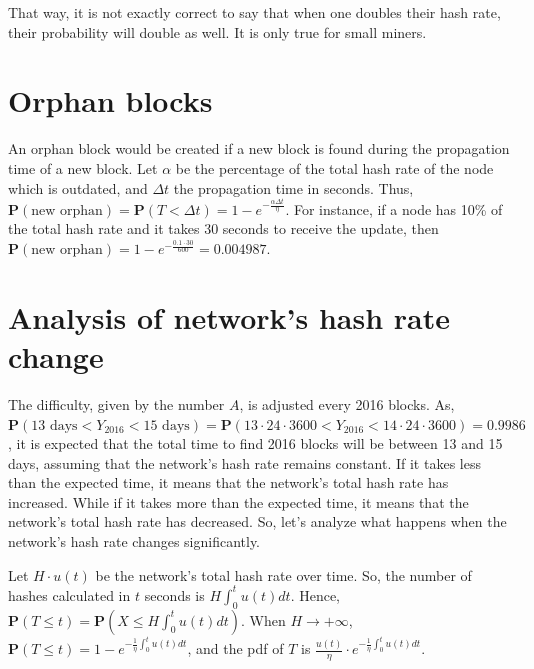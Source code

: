 That way, it is not exactly correct to say that when one doubles their hash rate, their probability will double as well. It is only true for small miners.

\section{Orphan blocks}

An orphan block would be created if a new block is found during the propagation time of a new block. Let $\alpha$ be the percentage of the total hash rate of the node which is outdated, and $\Delta t$ the propagation time in seconds. Thus, $\mathbf{P}(\text{new orphan}) = \mathbf{P}(T < \Delta t) = 1 - e^{-\frac{\alpha \Delta t}{\eta}}$. For instance, if a node has 10\% of the total hash rate and it takes 30 seconds to receive the update, then $\mathbf{P}(\text{new orphan}) = 1 - e^{-\frac{0.1 \cdot 30}{600}} = 0.004987$.

\section{Analysis of network's hash rate change}

The difficulty, given by the number $A$, is adjusted every 2016 blocks. As, $\mathbf{P}(13 \text{ days} < Y_{2016} < 15 \text{ days}) = \mathbf{P}(13 \cdot 24 \cdot 3600 < Y_{2016} < 14 \cdot 24 \cdot 3600) = 0.9986$, it is expected that the total time to find 2016 blocks will be between 13 and 15 days, assuming that the network's hash rate remains constant. If it takes less than the expected time, it means that the network's total hash rate has increased. While if it takes more than the expected time, it means that the network's total hash rate has decreased. So, let's analyze what happens when the network's hash rate changes significantly.


Let $H \cdot u(t)$ be the network's total hash rate over time. So, the number of hashes calculated in $t$ seconds is $H \int_0^t u(t) dt$. Hence, $\mathbf{P}(T \leq t) = \mathbf{P}(X \leq H \int_0^t u(t)dt)$. When $H \rightarrow +\infty$, $\mathbf{P}(T \leq t) = 1 - e^{-\frac{1}{\eta} \int_0^t u(t) dt}$, and the pdf of $T$ is $\frac{u(t)}{\eta} \cdot e^{-\frac{1}{\eta} \int_0^t u(t)dt}$.

